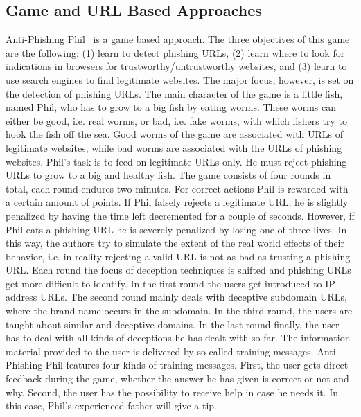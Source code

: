 \subsection{Game and URL Based Approaches}
Anti-Phishing Phil~\cite{sheng2007antiphishingphil} is a game based approach. 
The three objectives of this game are the following: 
(1) learn to detect phishing URLs, (2) learn where to look for indications in browsers for trustworthy/untrustworthy websites, and (3) learn to use search engines to find legitimate websites. 
The major focus, however, is set on the detection of phishing URLs. 
The main character of the game is a little fish, named Phil, who has to grow to a big fish by eating worms. 
These worms can either be good, i.e. real worms, or bad, i.e. fake worms, with which fishers try to hook the fish off the sea. 
Good worms of the game are associated with URLs of legitimate websites, while bad worms are associated with the URLs of phishing websites. 
Phil's task is to feed on legitimate URLs only. 
He must reject phishing URLs to grow to a big and healthy fish. 
The game consists of four rounds in total, each round endures two minutes. 
For correct actions Phil is rewarded with a certain amount of points. 
If Phil falsely rejects a legitimate URL, he is slightly penalized by having the time left decremented for a couple of seconds. 
However, if Phil eats a phishing URL he is severely penalized by losing one of three lives. 
In this way, the authors try to simulate the extent of the real world effects of their behavior, i.e.
in reality rejecting a valid URL is not as bad as trusting a phishing URL.
Each round the focus of deception techniques is shifted and phishing URLs get more difficult to identify. 
In the first round the users get introduced to IP address URLs. 
The second round mainly deals with deceptive subdomain URLs, where the brand name occurs in the subdomain. 
In the third round, the users are taught about similar and deceptive domains. 
In the last round finally, the user has to deal with all kinds of deceptions he has dealt with so far. 
The information material provided to the user is delivered by so called training messages. 
Anti-Phishing Phil features four kinds of training messages. 
First, the user gets direct feedback during the game, whether the answer he has given is correct or not and why. 
Second, the user has the possibility to receive help in case he needs it. 
In this case, Phil's experienced father will give a tip. 
